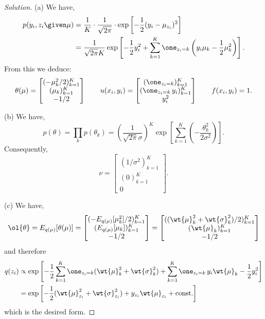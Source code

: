 \documentclass{article}
\newenvironment{solution}{\begin{proof}[Solution]}{\end{proof}}
\begin{document}
\begin{solution}
\renewcommand\arraystretch{1.5}
(a) We have,
\begin{align*}
p(y_i, z_i \given \mu) &= \frac{1}{K} \cdot \frac{1}{\sqrt{2\pi}} \cdot \exp\left[ -\frac{1}{2} (y_i - \mu_{z_i})^2 \right] \\
&= \frac{1}{\sqrt{2\pi} K} \exp\left[ -\frac{1}{2} y_i^2 + \sum_{k=1}^K \one_{z_i = k} \left(y_i \mu_k - \frac{1}{2} \mu_k^2 \right) \right].
\end{align*}
From this we deduce:
\[
\theta(\mu) = \begin{bmatrix} (-\mu_k^2/2)_{k=1}^K \\ (\mu_k)_{k=1}^K \\ -1/2 \end{bmatrix}
\qquad
u(x_i, y_i) = \begin{bmatrix} (\one_{z_i = k})_{k=1}^K \\ (\one_{z_i = k}\, y_i)_{k=1}^K \\ y_i^2 \end{bmatrix}
\qquad
f(x_i, y_i) = 1.
\]

(b) We have,
\[ p(\theta) = \prod_k p(\theta_k) = \left( \frac{1}{\sqrt{2\pi}\sigma} \right)^K \exp\left[ \sum_{k=1}^K \left( -\frac{\theta_k^2}{2\sigma^2} \right) \right]. \]
Consequently,
\[
\nu = \begin{bmatrix} (1/\sigma^2)_{k=1}^K \\ (0)_{k=1}^K \\ 0 \end{bmatrix}.
\]

(c) We have,
\[
\ol{\theta} = E_{q(\mu)}[\theta(\mu)] = \begin{bmatrix} (-E_{q(\mu)}[\mu_k^2]/2)_{k=1}^K \\ (E_{q(\mu)}[\mu_k])_{k=1}^K \\ -1/2 \end{bmatrix} = \begin{bmatrix} ((\wt{\mu}_k^2 + \wt{\sigma}_k^2)/2)_{k=1}^K \\ (\wt{\mu}_k)_{k=1}^K \\ -1/2 \end{bmatrix}
\]
and therefore
\begin{align*}
q(z_i) &\propto \exp\left[ -\frac{1}{2} \sum_{k=1}^K \one_{z_i=k} ( \wt{\mu}_k^2 + \wt{\sigma}_k^2 ) + \sum_{k=1}^K \one_{z_i=k}\, y_i \wt{\mu}_k - \frac{1}{2}y_i^2 \right] \\
&= \exp\left[ -\frac{1}{2} (\wt{\mu}_{z_i}^2 + \wt{\sigma}_{z_i}^2) + y_{z_i} \wt{\mu}_{z_i} + \text{const.} \right]
\end{align*}
which is the desired form.


\end{solution}
\end{document}
